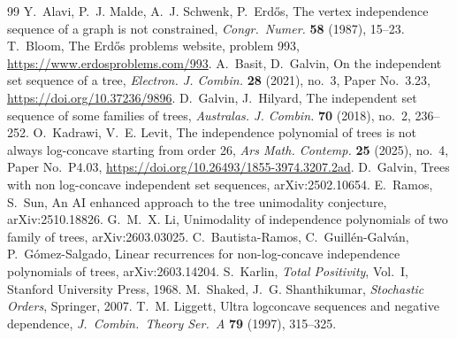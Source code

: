 \documentclass[11pt]{article}
\theoremstyle{definition}
\begin{document}
\begin{thebibliography}{99}
 Y.~Alavi, P.~J. Malde, A.~J. Schwenk, P.~Erd\H{o}s,
  The vertex independence sequence of a graph is not constrained,
  \emph{Congr.\ Numer.} \textbf{58} (1987), 15--23.
 T.~Bloom, The Erd\H{o}s problems website,
  problem 993, \url{https://www.erdosproblems.com/993}.
 A.~Basit, D.~Galvin, On the independent set
  sequence of a tree, \emph{Electron. J. Combin.} \textbf{28} (2021),
  no.~3, Paper No.~3.23, \url{https://doi.org/10.37236/9896}.
 D.~Galvin, J.~Hilyard, The independent set
  sequence of some families of trees, \emph{Australas. J. Combin.}
  \textbf{70} (2018), no.~2, 236--252.
 O.~Kadrawi, V.~E. Levit, The independence
  polynomial of trees is not always log-concave starting from order
  26, \emph{Ars Math. Contemp.} \textbf{25} (2025), no.~4, Paper
  No.~P4.03, \url{https://doi.org/10.26493/1855-3974.3207.2ad}.
 D.~Galvin, Trees with non log-concave independent
  set sequences, arXiv:2502.10654.
 E.~Ramos, S.~Sun, An AI enhanced approach to the
  tree unimodality conjecture, arXiv:2510.18826.
 G.~M.~X. Li, Unimodality of independence polynomials of
  two family of trees, arXiv:2603.03025.
 C.~Bautista-Ramos, C.~Guill\'en-Galv\'an,
  P.~G\'omez-Salgado, Linear recurrences for non-log-concave
  independence polynomials of trees, arXiv:2603.14204.
 S.~Karlin, \emph{Total Positivity}, Vol.~I,
  Stanford University Press, 1968.
 M.~Shaked, J.~G. Shanthikumar,
  \emph{Stochastic Orders}, Springer, 2007.
 T.~M. Liggett, Ultra logconcave sequences and
  negative dependence, \emph{J.\ Combin.\ Theory Ser.\ A} \textbf{79}
  (1997), 315--325.
\end{thebibliography}
\end{document}
